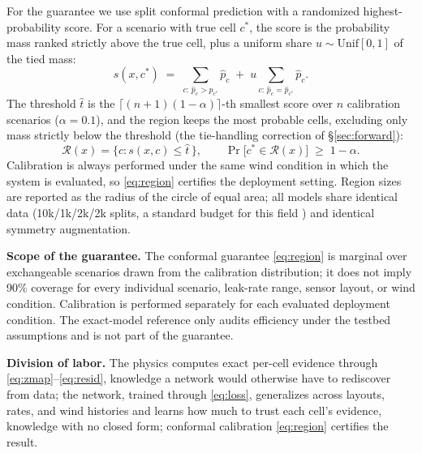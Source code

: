 \documentclass[conference]{IEEEtran}
\begin{document}
For the guarantee we use split conformal prediction with a randomized
highest-probability score. For a scenario with true cell $c^\ast$, the
score is the probability mass ranked strictly above the true cell, plus a
uniform share $u \sim \mathrm{Unif}[0,1]$ of the tied mass:
\begin{equation}
\label{eq:score}
s(x, c^\ast) \;=\;
\sum_{c:\, \hat p_c > \hat p_{c^\ast}} \hat p_c
\;+\; u \sum_{c:\, \hat p_c = \hat p_{c^\ast}} \hat p_c .
\end{equation}
The threshold $\hat t$ is the $\lceil (n{+}1)(1{-}\alpha)\rceil$-th
smallest score over $n$ calibration scenarios ($\alpha = 0.1$), and the
region keeps the most probable cells, excluding only mass strictly below
the threshold (the tie-handling correction of \S\ref{sec:forward}):
\begin{equation}
\label{eq:region}
\mathcal{R}(x) = \big\{c : s(x,c) \le \hat t\,\big\},
\qquad
\Pr\big[c^\ast \in \mathcal{R}(x)\big] \;\ge\; 1 - \alpha .
\end{equation}
Calibration is always performed under the same wind condition in which
the system is evaluated, so \eqref{eq:region} certifies the deployment
setting. Region sizes are reported as the radius of the circle of equal
area; all models share identical data (10k/1k/2k/2k splits, a standard
budget for this field \cite{sbibm}) and identical symmetry augmentation.

\textbf{Scope of the guarantee.} The conformal guarantee
\eqref{eq:region} is marginal over exchangeable scenarios drawn from the
calibration distribution; it does not imply 90\% coverage for every
individual scenario, leak-rate range, sensor layout, or wind
condition. Calibration is performed separately for each evaluated
deployment condition. The exact-model reference only audits efficiency under the testbed
assumptions and is not part of the guarantee.

\textbf{Division of labor.} The physics computes exact per-cell
evidence through \eqref{eq:zmap}--\eqref{eq:resid}, knowledge a network
would otherwise have to rediscover from data; the network, trained
through \eqref{eq:loss}, generalizes across layouts, rates, and wind
histories and learns how much to trust each cell's evidence, knowledge
with no closed form; conformal calibration \eqref{eq:region} certifies
the result.
\end{document}
